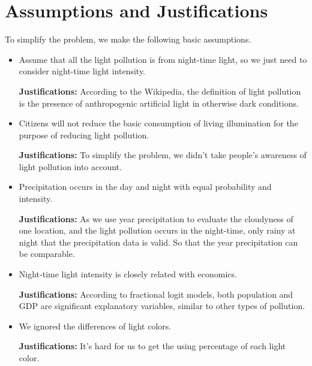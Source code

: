\MinParskip{}
\section{Assumptions and Justifications} 
To simplify the problem, we make the following basic assumptions.

\begin{itemize}
    \item Assume that all the light pollution is from night-time light, so we just need to consider night-time light intensity.  

    \textbf{Justifications: }According to the Wikipedia\cite{wiki}, the definition of light pollution is the presence of anthropogenic artificial light in otherwise dark conditions. 

    \item Citizens will not reduce the basic consumption of living illumination for the purpose of reducing light pollution.
    
    \textbf{Justifications: }To simplify the problem, we didn't take people's awareness of light pollution into account.

    \item Precipitation occurs in the day and night with equal probability and intensity.
    
    \textbf{Justifications: }As we use year precipitation to evaluate the cloudyness of one location, and the light pollution occurs in the night-time, only rainy at night that the precipitation data is valid. So that the year precipitation can be comparable.

    \item Night-time light intensity is closely related with economics.
    
    \textbf{Justifications: }According to fractional logit models\cite{GALLAWAY2010658}, both population and GDP are significant explanatory variables, similar to other types of pollution. 

    \item We ignored the differences of light colors.
    
    \textbf{Justifications: }It's hard for us to get the using percentage of each light color.
\end{itemize}


